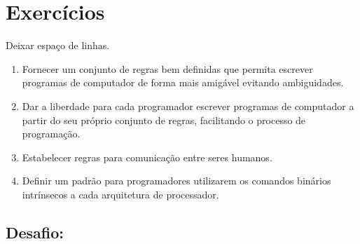 \section{Exercícios}
    Deixar espaço de linhas.
    \vspace{4cm}        %
    
    \begin{enumerate}
        \item Fornecer um conjunto de regras bem definidas que permita escrever programas de computador de forma mais amigável evitando ambiguidades.
        \item Dar a liberdade para cada programador escrever programas de computador a partir do seu próprio conjunto de regras, facilitando o processo de programação.
        \item Estabelecer regras para comunicação entre seres humanos.
        \item Definir um padrão para programadores utilizarem os comandos binários intrínsecos a cada arquitetura de processador.
    \end{enumerate}

\subsection{}

\subsection{}

\subsection{}

\subsection{\large{Desafio:}}
